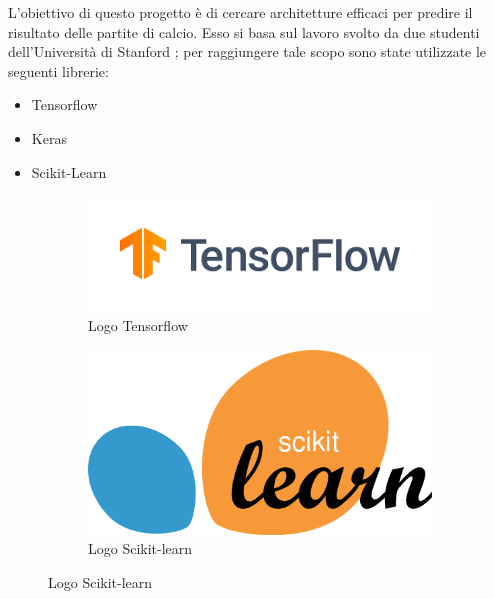 L'obiettivo di questo progetto è di cercare architetture efficaci per predire il risultato delle partite di calcio. Esso si basa sul lavoro svolto da due studenti dell'Università di Stanford \cite{cs230:2020}; per raggiungere tale scopo sono state utilizzate le seguenti librerie:
\begin{itemize}
    \item Tensorflow
    \item Keras
    \item Scikit-Learn
\end{itemize}

\begin{figure}[h]
    \centering
    \begin{subfigure}{.5\textwidth}
      \centering
      \includegraphics[width=.8\linewidth]{tesina/img/tensorflow_logo.png}
      \caption{Logo Tensorflow}
      \label{fig:sub1}
    \end{subfigure}%
    \begin{subfigure}{.5\textwidth}
      \centering
      \includegraphics[width=.4\linewidth]{tesina/img/Scikit_learn_logo.png}
      \caption{Logo Scikit-learn}
      \label{fig:sub2}
    \end{subfigure}
    \label{fig:test}
\end{figure}
